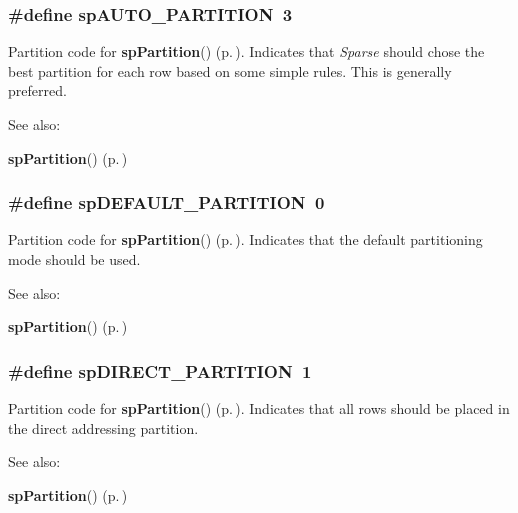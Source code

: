 \subsubsection{\setlength{\rightskip}{0pt plus 5cm}\#define sp\-AUTO\_\-PARTITION\ 3}\label{spMatrix_8h_a12}


Partition code for {\bf sp\-Partition}() {\rm (p.\,\pageref{spMatrix_8h_a47})}. Indicates that {\em Sparse} should chose the best partition for each row based on some simple rules. This is generally preferred. \begin{Desc}
\item[See also: ]\par
{\bf sp\-Partition}() {\rm (p.\,\pageref{spMatrix_8h_a47})} \end{Desc}
\subsubsection{\setlength{\rightskip}{0pt plus 5cm}\#define sp\-DEFAULT\_\-PARTITION\ 0}\label{spMatrix_8h_a9}


Partition code for {\bf sp\-Partition}() {\rm (p.\,\pageref{spMatrix_8h_a47})}. Indicates that the default partitioning mode should be used. \begin{Desc}
\item[See also: ]\par
{\bf sp\-Partition}() {\rm (p.\,\pageref{spMatrix_8h_a47})} \end{Desc}
\subsubsection{\setlength{\rightskip}{0pt plus 5cm}\#define sp\-DIRECT\_\-PARTITION\ 1}\label{spMatrix_8h_a10}


Partition code for {\bf sp\-Partition}() {\rm (p.\,\pageref{spMatrix_8h_a47})}. Indicates that all rows should be placed in the direct addressing partition. \begin{Desc}
\item[See also: ]\par
{\bf sp\-Partition}() {\rm (p.\,\pageref{spMatrix_8h_a47})} \end{Desc}
